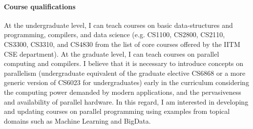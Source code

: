 \paragraph{Course qualifications}
At the undergraduate level, I can teach courses on basic data-structures and programming, compilers, and data science (e.g. CS1100, CS2800, CS2110, CS3300, CS3310, and CS4830 from the list of core courses offered by the IITM CSE department). At the graduate level, I can teach courses on parallel computing and compilers.
I believe that it is necessary to introduce concepts on parallelism (undergraduate equivalent of the graduate elective CS6868 or a more generic version of CS6023 for undergraduates) early in the curriculum considering the computing power demanded by modern applications, and the pervasiveness and availability of parallel hardware. 
In this regard, I am interested in developing and updating courses on parallel programming using examples from topical domains such as Machine Learning and BigData.







  

